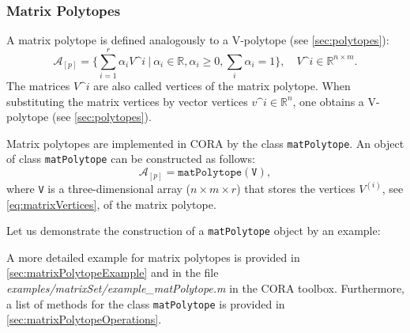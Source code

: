 \subsubsection{Matrix Polytopes} \label{sec:polytopeMatrix}

A matrix polytope is defined analogously to a V-polytope (see \cref{sec:polytopes}):
\begin{equation}\label{eq:matrixVertices}
 \mathcal{A}_{[p]}=\bigg \{ \sum_{i=1}^{r} \alpha_i V\^i ~\Big|~ \alpha_i \in\mathbb{R}, \alpha_i \geq 0, \sum_i \alpha_i=1 \bigg \}, \quad V\^i \in \mathbb{R}^{n\times m}.
\end{equation}
The matrices $V\^i$ are also called vertices of the matrix polytope.
When substituting the matrix vertices by vector vertices $v\^{i}\in \mathbb{R}^{n}$, one obtains a V-polytope (see \cref{sec:polytopes}).

Matrix polytopes are implemented in CORA by the class \texttt{matPolytope}.
An object of class \texttt{matPolytope} can be constructed as follows:
\begin{equation*}
	 \mathcal{A}_{[p]} = \texttt{matPolytope}(\texttt{V}),
\end{equation*}
where \texttt{V} is a three-dimensional array ($n\times m\times r$) that stores the vertices $V^{(i)}$, see \eqref{eq:matrixVertices}, of the matrix polytope.

Let us demonstrate the construction of a \texttt{matPolytope} object by an example:

\begin{center}
\begin{minipage}[t]{0.40\textwidth}
	\footnotesize
	
\end{minipage}
\end{center}

A more detailed example for matrix polytopes is provided in \cref{sec:matrixPolytopeExample} and in the file \textit{examples/matrixSet/example\_matPolytope.m} in the CORA toolbox. Furthermore, a list of methods for the class \texttt{matPolytope} is provided in \cref{sec:matrixPolytopeOperations}.
